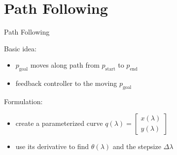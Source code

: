 \documentclass{beamer}
\begin{document}
\section{Path Following}
\begin{frame}{Path Following}
  
  
  Basic idea:
  \begin{itemize}
  \item
    $p_\text{goal}$ moves along path from $p_\text{start}$ to $p_\text{end}$
  \item
    feedback controller to the moving $p_\text{goal}$
  \end{itemize}
  
  \vfill
  
  Formulation:
  \begin{itemize}
  \item
    create a parameterized curve
    $
    q(\lambda) = \begin{bmatrix} x(\lambda) \\ y(\lambda) \end{bmatrix}
    $
  \item
    use its derivative to find $\theta(\lambda)$ and the stepsize $\Delta\lambda$
  \end{itemize}
  
\end{frame}
\end{document}
